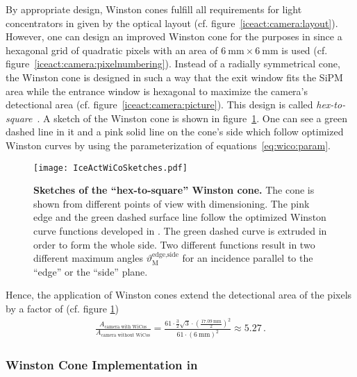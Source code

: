 By appropriate design, Winston cones fulfill all requirements for light concentrators in \iceact given by the optical layout (cf. figure~\ref{iceact:camera:layout}).
However, one can design an improved Winston cone for the purposes in \iceact since a hexagonal grid of quadratic pixels with an area of $\SI{6}{\milli\meter}\times\SI{6}{\milli\meter}$ is used (cf. figure~\ref{iceact:camera:pixelnumbering}). Instead of a radially symmetrical cone, the \iceact Winston cone is designed in such a way that the exit window fits the SiPM area while the entrance window is hexagonal to maximize the camera's detectional area (cf. figure~\ref{iceact:camera:picture}). This design is called \textit{hex-to-square}~\cite{iceact:camera}. A sketch of the \iceact Winston cone is shown in figure~\ref{iceact:camera:iceact_wico_sketch}. One can see a green dashed line in it and a pink solid line on the cone's side which follow optimized Winston curves by using the parameterization of equations~\eqref{eq:wico:param}.\\

\begin{figure}[H]
	\centering
	\texttt{[image: IceActWiCoSketches.pdf]}
	\caption[Sketches of the \iceact \enquote{hex-to-square} Winston cone]{\textbf{Sketches of the \iceact \enquote{hex-to-square} Winston cone.} The cone is shown from different points of view with dimensioning. The pink edge and the green dashed surface line follow the optimized Winston curve functions developed in \cite{iceact:camera}. The green dashed curve is extruded in order to form the whole side. Two different functions result in two different maximum angles $\vartheta_\text{M}^\text{edge,side}$ for an incidence parallel to the \enquote{edge} or the \enquote{side} plane.}
	\label{iceact:camera:iceact_wico_sketch}	
\end{figure}

Hence, the application of Winston cones extend the detectional area of the pixels by a factor of (cf. figure \ref{iceact:camera:iceact_wico_sketch})
\begin{align}
	\frac{A_\text{camera with WiCos}}{A_\text{camera without WiCos}} = \frac{61\cdot \frac{3}{2}\sqrt{3}\cdot\left(\frac{\SI{17.09}{\milli\meter}}{2}\right)^2}{61\cdot(\SI{6}{\milli\meter})^2}\approx\num{5.27}\,.
\end{align}

\subsubsection{Winston Cone Implementation in \geant}\label{sec:winstoncones:impl}

